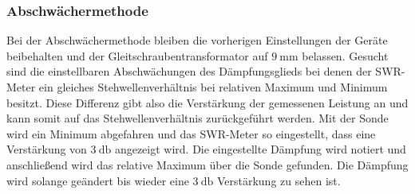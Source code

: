 \subsubsection{Abschwächermethode}
Bei der Abschwächermethode bleiben die vorherigen Einstellungen der Geräte beibehalten und der Gleitschraubentransformator auf $\SI{9}{\milli\meter}$ belassen. Gesucht sind die einstellbaren Abschwächungen des Dämpfungsglieds bei denen der SWR-Meter 
ein gleiches Stehwellenverhältnis bei relativen Maximum und Minimum besitzt. Diese Differenz gibt also die Verstärkung der gemessenen Leistung an und kann somit auf das Stehwellenverhältnis zurückgeführt werden.
Mit der Sonde wird ein Minimum abgefahren und das SWR-Meter so eingestellt, dass eine Verstärkung von $\SI{3}{\decibel}$ angezeigt wird. Die eingestellte Dämpfung wird notiert und anschließend wird das relative Maximum über die Sonde gefunden. Die Dämpfung wird solange
geändert bis wieder eine $\SI{3}{\decibel}$ Verstärkung zu sehen ist.

